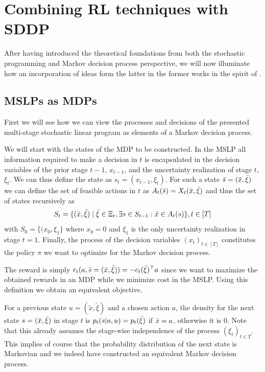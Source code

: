 \documentclass[a4paper,12pt]{article}
\begin{document}
\section{Combining RL techniques with SDDP}

After having introduced the theoretical foundations from both the stochastic programming and Markov decision process perspective, we will now illuminate how an incorporation of ideas form the latter in the former works in the spirit of \cite{avila2023batch}.

\subsection{MSLPs as MDPs}
First we will see how we can view the processes and decisions of the presented multi-stage stochastic linear program as elements of a Markov decision process.

We will start with the states of the MDP to be constructed. In the MSLP all information required to make a decision in $t$ is encapsulated in the decision variables of the prior stage $t-1$, $x_{t-1}$, and the uncertainty realization of stage $t$, $\xi_t$. 
We can thus define the state as $s_t = (x_{t-1}, \xi_t)$. For such a state $\Bar{s} = (\Bar{x}, \Bar{\xi})$ we can define the set of feasible actions in $t$ as $A_t(\Bar{s}) = X_t(\Bar{x}, \Bar{\xi})$ and thus the set of states recursively as
\[S_t = \{(\Bar{x},\Bar{\xi}) \mid \Bar{\xi} \in \Xi_t, \exists s \in S_{t-1} : \Bar{x}\in A_t(s) \}, t \in [T]\] with $S_0 = \{(x_0, \xi_1\}$ where $x_0 = 0$ and $\xi_1$ is the only uncertainty realization in stage $t=1$.
Finally, the process of the decision variables $(x_t)_{t\in [T]}$ constitutes the policy $\pi$ we want to optimize for the Markov decision process.

The reward is simply $r_t(a, \Bar{s} = (\Bar{x},\Bar{\xi})) = -c_t(\Bar{\xi})^\top a$ since we want to maximize the obtained rewards in an MDP while we minimize cost in the MSLP. Using this definition we obtain an equivalent objective.

For a previous state $u = (\tilde{x}, \tilde{\xi})$ and a chosen action $a$, the density for the next state $s = (\Bar{x}, \Bar{\xi})$ in stage $t$ is $p_t(s | a, u) = p_t(\Bar{\xi})$ if $\Bar{x} = a$, otherwise it is $0$. Note that this already assumes the stage-wise independence of the process $(\xi_t)_{t\in T}$. This implies of course that the probability distribution of the next state is Markovian and we indeed have constructed an equivalent Markov decision process.
\end{document}
